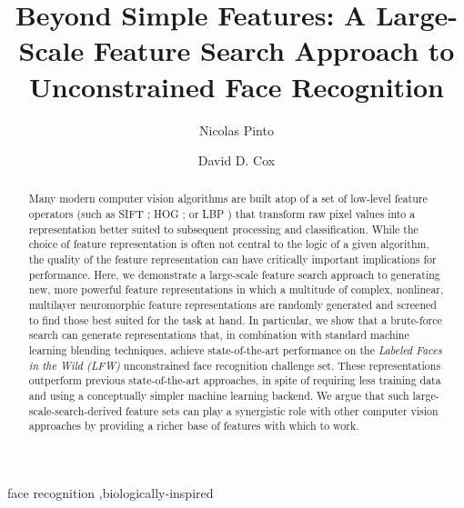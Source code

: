\documentclass[preprint, 12pt]{elsarticle}
\begin{document}
\begin{frontmatter}

\title{
Beyond Simple Features: A Large-Scale Feature Search Approach to Unconstrained Face Recognition
}

\author[rowland,mit]{Nicolas Pinto}

\author[rowland]{David D. Cox}

\address[rowland]{The Rowland Institute at Harvard, Harvard University, Cambridge, MA 02142}
\address[mit]{McGovern Institute for Brain Science at MIT, Cambridge, MA 02139}


\begin{abstract}
Many modern computer vision algorithms are built atop of a set of low-level
feature operators (such as SIFT \cite{sift,luo2007person}; HOG \cite{dalal2005hog,albiol2008face}; or LBP
\cite{ahonen2004face,ahonen2006face}) that transform raw pixel values into a representation better
suited to subsequent processing and classification.  While the choice of feature
representation is often not central to the logic of a given algorithm, the
quality of the feature representation can have critically important implications
for performance.  Here, we demonstrate a large-scale feature search approach to
generating new, more powerful feature representations in which a multitude of
complex, nonlinear, multilayer neuromorphic feature representations are randomly
generated and screened to find those best suited for the task at hand.  In
particular, we show that a brute-force search can generate representations that,
in combination with standard machine learning blending techniques, achieve
state-of-the-art performance on the \emph{Labeled Faces in the Wild (LFW)} \cite{huang:lfw}
unconstrained face recognition challenge set.  These representations outperform
previous state-of-the-art approaches, in spite of requiring less training data
and using a conceptually simpler machine learning backend.  We argue that such
large-scale-search-derived feature sets can play a synergistic role with other
computer vision approaches by providing a richer base of features with which to
work.

\end{abstract}

\begin{keyword}
face recognition \sep biologically-inspired
\end{keyword}

\end{frontmatter}
\end{document}
